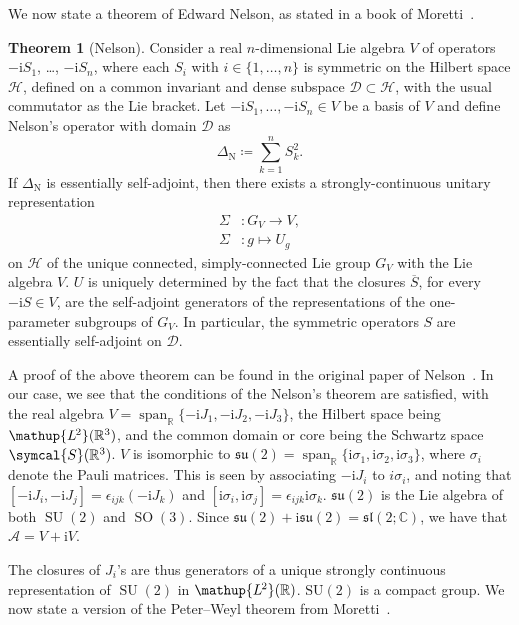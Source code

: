 \documentclass[12pt, a4 paper]{article}
\theoremstyle{definition}
\newtheorem{thm}{Theorem}
\newcommand{\ltwo}{\mathup{L\kern-0.7pt^2}}
\newcommand{\ltworthree}{\ltwo(\rr^3)}
\newcommand{\rr}{\mathbb{R}}
\newcommand{\cc}{\mathbb{C}}
\newcommand{\hilbert}{\mathcal{H}}
\newcommand{\ltwor}{\ltwo(\rr)}
\newcommand{\schwartz}{\symcal{S}}
\newcommand{\schwartzrthree}{\schwartz(\rr^3)}
\renewcommand{\i}{\mathrm{i}}
\newcommand{\domain}{\mathcal{D}}
\DeclareMathOperator{\spann}{span}
\newcommand{\sutwo}{\mathfrak{su}(2)}
\newcommand{\sltwoc}{\mathfrak{sl}(2;\cc)}
\begin{document}
	We now state a theorem of Edward Nelson, as stated in a book of Moretti~\cite[p.~291]{MorettiFundamental}.
	\begin{thm}[Nelson]
		Consider a real \(n\)-dimensional Lie algebra \(V\) of operators \(-\i S_1\), \ldots, \(-\i S_n\), where each \(S_i\) with \(i \in \{1, \ldots, n\}\) is symmetric on the Hilbert space \(\hilbert\), defined on a common invariant and dense subspace \(\domain \subset \hilbert\), with the usual commutator as the Lie bracket.
		Let \(-\i S_1, \ldots, -\i S_n \in V\) be a basis of \(V\) and define Nelson's operator with domain \(\domain\) as
		\[
			\Delta_{\mathrm{N}} \coloneq \sum_{k=1}^{n} S_k^2.
		\]
		If \(\Delta_{\mathrm{N}}\) is essentially self-adjoint, then there exists a strongly-continuous unitary representation
		\begin{align*}
		    \Sigma &\colon G_V \rightarrow V,\\
			\Sigma &\colon g \mapsto U_g
		\end{align*}
		on \(\hilbert\) of the unique connected, simply-connected Lie group \(G_V\) with the Lie algebra \(V\).
		\(U\) is uniquely determined by the fact that the closures \(\overline{S}\), for every \(-\i S \in V\), are the self-adjoint generators of the representations of the one-parameter subgroups of \(G_V\). In particular, the symmetric operators \(S\) are essentially self-adjoint on \(\domain\).
	\end{thm}
	A proof of the above theorem can be found in the original paper of Nelson~\cite{Nelson}. In our case, we see that the conditions of the Nelson's theorem are satisfied, with the real algebra \(V = \spann_{\rr}\{-\i J_1, -\i J_2, -\i J_3\}\), the Hilbert space being \(\ltworthree\), and the common domain or core  being the Schwartz space \(\schwartzrthree\). \(V\) is isomorphic to \(\sutwo = \spann_{\rr}\{\i\sigma_1, \i\sigma_2, \i\sigma_3\}\), where \(\sigma_i\) denote the Pauli matrices. This is seen by associating \(-\i J_i\) to \(i\sigma_i\), and noting that \([-\i J_i, -\i J_j] = \epsilon_{ijk}(-\i J_k)\) and \([\i\sigma_i, \i\sigma_j] = \epsilon_{ijk}\i\sigma_k\). \(\sutwo\) is the Lie algebra of both \(\operatorname{SU}(2)\) and \(\operatorname{SO}(3)\). Since \(\sutwo + \i \sutwo = \sltwoc\), we have that \(\mathcal{A} = V + \i V\).

	The closures of \(J_i\)'s are thus generators of a unique strongly continuous representation of \(\operatorname{SU}(2)\) in \(\ltwor\). \(\operatorname{SU(2)}\) is a compact group. We now state a version of the Peter--Weyl theorem from Moretti~\cite[p.~287]{MorettiFundamental}.
\end{document}
